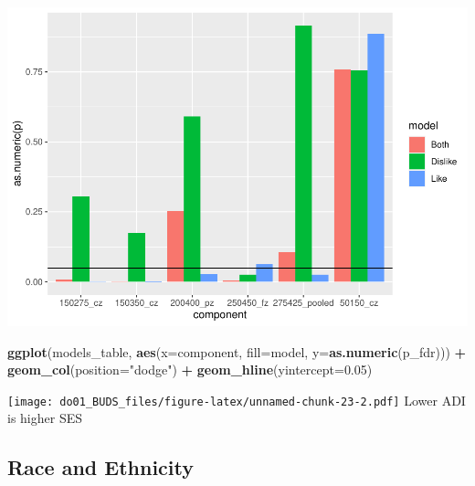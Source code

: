 \documentclass[
]{article}
\newenvironment{Shaded}{\begin{snugshade}}{\end{snugshade}}
\newcommand{\AttributeTok}[1]{\textcolor[rgb]{0.13,0.29,0.53}{#1}}
\newcommand{\FloatTok}[1]{\textcolor[rgb]{0.00,0.00,0.81}{#1}}
\newcommand{\FunctionTok}[1]{\textcolor[rgb]{0.13,0.29,0.53}{\textbf{#1}}}
\newcommand{\NormalTok}[1]{#1}
\newcommand{\SpecialCharTok}[1]{\textcolor[rgb]{0.81,0.36,0.00}{\textbf{#1}}}
\newcommand{\StringTok}[1]{\textcolor[rgb]{0.31,0.60,0.02}{#1}}
\begin{document}
\includegraphics{do01_BUDS_files/figure-latex/unnamed-chunk-23-1.pdf}

\begin{Shaded}
\begin{Highlighting}[]
\FunctionTok{ggplot}\NormalTok{(models\_table, }\FunctionTok{aes}\NormalTok{(}\AttributeTok{x=}\NormalTok{component, }\AttributeTok{fill=}\NormalTok{model, }\AttributeTok{y=}\FunctionTok{as.numeric}\NormalTok{(p\_fdr))) }\SpecialCharTok{+}
  \FunctionTok{geom\_col}\NormalTok{(}\AttributeTok{position=}\StringTok{"dodge"}\NormalTok{) }\SpecialCharTok{+}
  \FunctionTok{geom\_hline}\NormalTok{(}\AttributeTok{yintercept=}\FloatTok{0.05}\NormalTok{)}
\end{Highlighting}
\end{Shaded}

\texttt{[image: do01\_BUDS\_files/figure-latex/unnamed-chunk-23-2.pdf]}
Lower ADI is higher SES

\hypertarget{race-and-ethnicity}{%
\subsection{Race and Ethnicity}\label{race-and-ethnicity}}
\end{document}
